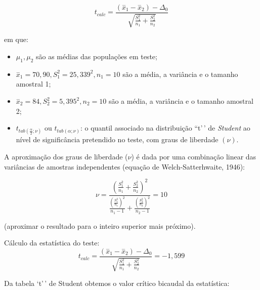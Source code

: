\documentclass[
]{book}
\providecommand{\tightlist}{%
  \setlength{\itemsep}{0pt}\setlength{\parskip}{0pt}}
\begin{document}
\hfill\break

\[
t_{calc} =  \frac{(\stackrel{-}{x}_{1} - \stackrel{-}{x}_{2})-\Delta_{0}}  { \sqrt{\frac{S^{2}_{1}}{n_{1}}+\frac{S^{2}_{2}}{n_{2}}}} 
\]

\hfill\break

em que:

\begin{itemize}
\tightlist
\item
  \(\mu_{1} , \mu_{2}\) são as médias das populações em teste;\\
\item
  \(\stackrel{-}{x}_{1}=70,90, S_{1}^{2}= 25,339^{2} , n_{1}=10\) são a média, a variância e o tamanho amostral 1;\\
\item
  \(\stackrel{-}{x}_{2}=84, S_{2}^{2}= 5,395^{2} , n_{2}=10\) são a média, a variância e o tamanho amostral 2;\\
\item
  \({t}_{tab \left(\frac{\alpha }{2};\nu \right)}\) ou \({t}_{tab \left(\alpha ;\nu \right)}\): o quantil associado na distribuição ``t'\,' de \emph{Student} ao nível de significância pretendido no teste, com graus de liberdade \((\nu)\).
\end{itemize}

\hfill\break

A aproximação dos graus de liberdade (\(\nu\)) é dada por uma combinação linear das variâncias de amostras independentes (equação de Welch-Satterhwaite, 1946):

\[
\nu=\frac{{\left(\frac{{S}_{1}^{2}}{{n}_{1}}+\frac{{S}_{2}^{2}}{{n}_{2}}\right)}^{2}}{\frac{{\left(\frac{{S}_{1}^{2}}{{n}_{1}}\right)}^{2}}{{n}_{1}-1}+\frac{{\left(\frac{{S}_{2}^{2}}{{n}_{2}}\right)}^{2}}{{n}_{2}-1}}=10
\]

\hfill\break

(aproximar o resultado para o inteiro superior mais próximo).

\hfill\break

Cálculo da estatística do teste:\\

\[
t_{calc}  =  \frac{(\stackrel{-}{x}_{1} - \stackrel{-}{x}_{2})-\Delta_{0}}  { \sqrt{\frac{S^{2}_{1}}{n_{1}}+\frac{S^{2}_{2}}{n_{2}}}}=-1,599
\]

\hfill\break

Da tabela `t'\,' de Student obtemos o valor crítico bicaudal da estatística:

\hfill\break
\end{document}
